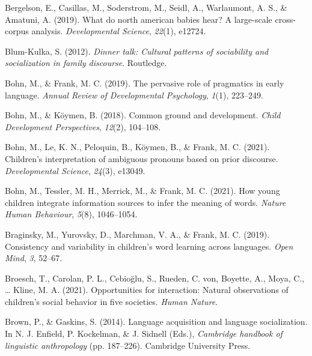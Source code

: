 \documentclass[
  man,floatsintext]{apa6}
\newlength{\cslhangindent}
\newlength{\cslentryspacingunit} %
\newenvironment{CSLReferences}[2] %
 {%
  \setlength{\parindent}{0pt}
  \ifodd #1
  \let\oldpar\par
  \def\par{\hangindent=\cslhangindent\oldpar}
  \fi
  \setlength{\parskip}{#2\cslentryspacingunit}
 }%
 {}
\begin{document}
\begin{CSLReferences}{1}{0}
\leavevmode{}%
Bergelson, E., Casillas, M., Soderstrom, M., Seidl, A., Warlaumont, A. S., \& Amatuni, A. (2019). What do north american babies hear? A large-scale cross-corpus analysis. \emph{Developmental Science}, \emph{22}(1), e12724.

\leavevmode{}%
Blum-Kulka, S. (2012). \emph{Dinner talk: Cultural patterns of sociability and socialization in family discourse}. Routledge.

\leavevmode{}%
Bohn, M., \& Frank, M. C. (2019). The pervasive role of pragmatics in early language. \emph{Annual Review of Developmental Psychology}, \emph{1}(1), 223--249.

\leavevmode{}%
Bohn, M., \& Köymen, B. (2018). Common ground and development. \emph{Child Development Perspectives}, \emph{12}(2), 104--108.

\leavevmode{}%
Bohn, M., Le, K. N., Peloquin, B., Köymen, B., \& Frank, M. C. (2021). Children's interpretation of ambiguous pronouns based on prior discourse. \emph{Developmental Science}, \emph{24}(3), e13049.

\leavevmode{}%
Bohn, M., Tessler, M. H., Merrick, M., \& Frank, M. C. (2021). How young children integrate information sources to infer the meaning of words. \emph{Nature Human Behaviour}, \emph{5}(8), 1046--1054.

\leavevmode{}%
Braginsky, M., Yurovsky, D., Marchman, V. A., \& Frank, M. C. (2019). Consistency and variability in children's word learning across languages. \emph{Open Mind}, \emph{3}, 52--67.

\leavevmode{}%
Broesch, T., Carolan, P. L., Cebioğlu, S., Rueden, C. von, Boyette, A., Moya, C., \ldots{} Kline, M. A. (2021). Opportunities for interaction: Natural observations of children's social behavior in five societies. \emph{Human Nature}.

\leavevmode{}%
Brown, P., \& Gaskins, S. (2014). Language acquisition and language socialization. In N. J. Enfield, P. Kockelman, \& J. Sidnell (Eds.), \emph{Cambridge handbook of linguistic anthropology} (pp. 187--226). Cambridge University Press.


\end{CSLReferences}
\end{document}
